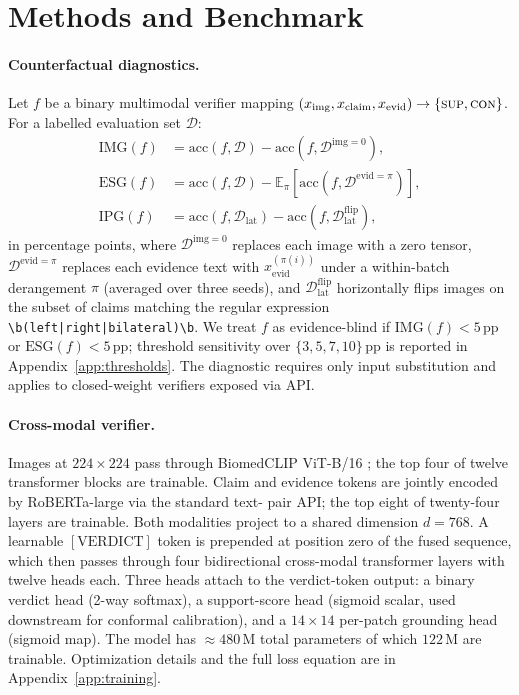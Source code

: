 \documentclass{article}
\begin{document}
\section{Methods and Benchmark}
\label{sec:methods}

\paragraph{Counterfactual diagnostics.} Let $f$ be a binary multimodal
verifier mapping $(x_{\mathrm{img}}, x_{\mathrm{claim}}, x_{\mathrm{evid}})
\to \{\textsc{sup}, \textsc{con}\}$. For a labelled evaluation set
$\mathcal{D}$:
\begin{align}
\mathrm{IMG}(f) &= \mathrm{acc}(f, \mathcal{D}) -
                   \mathrm{acc}(f, \mathcal{D}^{\mathrm{img}=0}), \\
\mathrm{ESG}(f) &= \mathrm{acc}(f, \mathcal{D}) -
                   \mathbb{E}_{\pi}\!\left[\mathrm{acc}(f, \mathcal{D}^{\mathrm{evid}=\pi})\right], \\
\mathrm{IPG}(f) &= \mathrm{acc}(f, \mathcal{D}_{\mathrm{lat}}) -
                   \mathrm{acc}(f, \mathcal{D}_{\mathrm{lat}}^{\mathrm{flip}}),
\end{align}
in percentage points, where $\mathcal{D}^{\mathrm{img}=0}$ replaces each
image with a zero tensor, $\mathcal{D}^{\mathrm{evid}=\pi}$ replaces each
evidence text with $x_{\mathrm{evid}}^{(\pi(i))}$ under a within-batch
derangement $\pi$ (averaged over three seeds), and
$\mathcal{D}_{\mathrm{lat}}^{\mathrm{flip}}$ horizontally flips images on
the subset of claims matching the regular expression
\texttt{\textbackslash b(left|right|bilateral)\textbackslash b}. We treat
$f$ as evidence-blind if $\mathrm{IMG}(f) < 5$\,pp or $\mathrm{ESG}(f) <
5$\,pp; threshold sensitivity over $\{3, 5, 7, 10\}$\,pp is reported in
Appendix~\ref{app:thresholds}. The diagnostic requires only input
substitution and applies to closed-weight verifiers exposed via API.

\paragraph{Cross-modal verifier.} Images at $224 \times 224$ pass through
BiomedCLIP ViT-B/16 \citep{zhang2024biomedclip}; the top four of twelve
transformer blocks are trainable. Claim and evidence tokens are jointly
encoded by RoBERTa-large \citep{liu2019roberta} via the standard text-
pair API; the top eight of twenty-four layers are trainable. Both
modalities project to a shared dimension $d = 768$. A learnable
$[\mathrm{VERDICT}]$ token is prepended at position zero of the fused
sequence, which then passes through four bidirectional cross-modal
transformer layers with twelve heads each. Three heads attach to the
verdict-token output: a binary verdict head (2-way softmax), a
support-score head (sigmoid scalar, used downstream for conformal
calibration), and a $14 \times 14$ per-patch grounding head (sigmoid
map). The model has $\approx 480$\,M total parameters of which $122$\,M
are trainable. Optimization details and the full loss equation are in
Appendix~\ref{app:training}.
\end{document}

